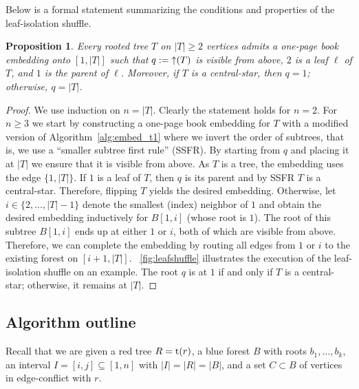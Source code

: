 \documentclass[11pt,a4paper,colorlinks=true,urlcolor=blue,citecolor=red]{article}
\theoremstyle{plain}
\newtheorem{proposition}[theorem]{Proposition}
\begin{document}
Below is a formal statement summarizing the conditions and properties of
the leaf-isolation shuffle.
\begin{proposition}\label{prop:leafshuffle}
  Every rooted tree $T$ on $|T|\ge 2$ vertices admits a one-page book
  embedding onto $[1,|T|]$ such that $q:=\mathop{\uparrow}(T)$ is visible from
  above, $2$ is a leaf $\ell$ of $T$, and $1$ is the parent of
  $\ell$. Moreover, if $T$ is a central-star, then $q=1$; otherwise,
  $q=|T|$.
\end{proposition}
\begin{proof}
  We use induction on $n=|T|$. Clearly the statement holds for $n=2$.
  For $n\ge 3$ we start by constructing a one-page book embedding for
  $T$ with a modified version of Algorithm~\ref{alg:embed_t1} where we
  invert the order of subtrees, that is, we use a ``smaller subtree
  first rule'' (SSFR). By starting from $q$ and placing it at $|T|$ we
  ensure that it is visible from above. As $T$ is a tree, the embedding
  uses the edge $\{1,|T|\}$. If $1$ is a leaf of $T$, then $q$ is its
  parent and by SSFR $T$ is a central-star. Therefore, flipping $T$
  yields the desired embedding. Otherwise, let $i\in\{2,\ldots,|T|-1\}$
  denote the smallest (index) neighbor of $1$ and obtain the desired
  embedding inductively for $B[1,i]$ (whose root is $1$). The root of
  this subtree $B[1,i]$ ends up at either $1$ or $i$, both of which are
  visible from above. Therefore, we can complete the embedding by
  routing all edges from $1$ or $i$ to the existing forest on
  $[i+1,|T|]$. \figurename~\ref{fig:leafshuffle} illustrates
  the execution of the leaf-isolation shuffle on an example. The root
  $q$ is at $1$ if and only if $T$ is a central-star; otherwise, it
  remains at $|T|$.
\end{proof}

\subsection{Algorithm outline}\label{proofstart}

Recall that we are given a red tree $R=\mathrm t(r)$, a blue forest $B$ with
roots $b_1,\ldots,b_k$, an interval $I=[i,j]\subseteq[1,n]$ with
$|I|=|R|=|B|$, and a set $C\subset B$ of vertices in edge-conflict with
$r$.
\end{document}
